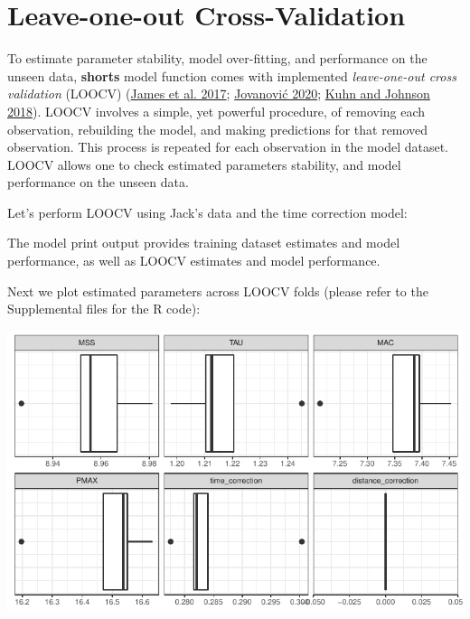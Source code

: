 \documentclass[fleqn,10pt,lineno]{wlpeerj} %
\newenvironment{Shaded}{\begin{snugshade}}{\end{snugshade}}
\newcommand{\AttributeTok}[1]{\textcolor[rgb]{0.77,0.63,0.00}{#1}}
\newcommand{\ConstantTok}[1]{\textcolor[rgb]{0.00,0.00,0.00}{#1}}
\newcommand{\FunctionTok}[1]{\textcolor[rgb]{0.00,0.00,0.00}{#1}}
\newcommand{\NormalTok}[1]{#1}
\newcommand{\OtherTok}[1]{\textcolor[rgb]{0.56,0.35,0.01}{#1}}
\newcommand{\SpecialCharTok}[1]{\textcolor[rgb]{0.00,0.00,0.00}{#1}}
\begin{document}
\hypertarget{leave-one-out-cross-validation}{%
\section{Leave-one-out Cross-Validation}\label{leave-one-out-cross-validation}}

To estimate parameter stability, model over-fitting, and performance on the unseen data, \textbf{shorts} model function comes with implemented \emph{leave-one-out cross validation} (LOOCV) (\protect\hyperlink{ref-jamesIntroductionStatisticalLearning2017}{James et al. 2017}; \protect\hyperlink{ref-jovanovicBmbstatsBootstrapMagnitudebased2020}{Jovanović 2020}; \protect\hyperlink{ref-kuhnAppliedPredictiveModeling2018}{Kuhn and Johnson 2018}). LOOCV involves a simple, yet powerful procedure, of removing each observation, rebuilding the model, and making predictions for that removed observation. This process is repeated for each observation in the model dataset. LOOCV allows one to check estimated parameters stability, and model performance on the unseen data.

Let's perform LOOCV using Jack's data and the time correction model:

\begin{Shaded}
\end{Shaded}

The model print output provides training dataset estimates and model performance, as well as LOOCV estimates and model performance.

Next we plot estimated parameters across LOOCV folds (please refer to the Supplemental files for the R code):

\begin{center}\includegraphics[width=0.9\linewidth]{paper_files/figure-latex/unnamed-chunk-51-1} \end{center}
\end{document}
